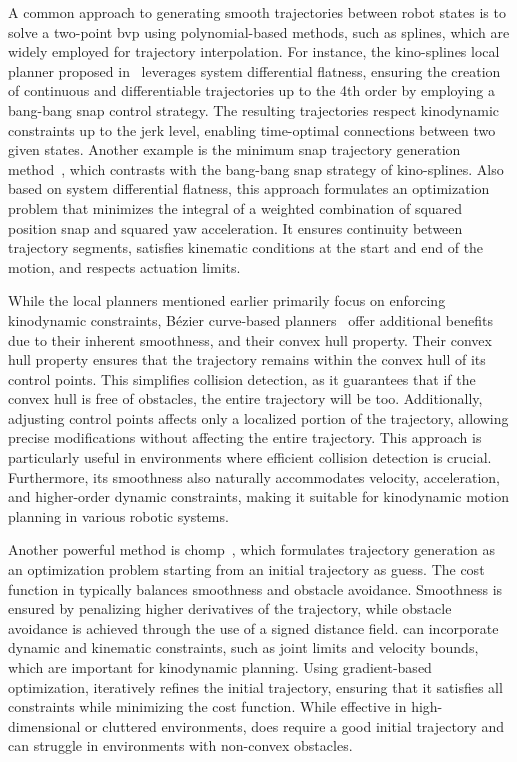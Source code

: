 A common approach to generating smooth trajectories between robot states is to solve a two-point \gls{bvp} using polynomial-based methods, such as splines, which are widely employed for trajectory interpolation. 
For instance, the kino-splines local planner proposed in~\cite{cKino} leverages system differential flatness, ensuring the creation of continuous and differentiable trajectories up to the 4th order by employing a bang-bang snap control strategy. 
The resulting trajectories respect kinodynamic constraints up to the jerk level, enabling time-optimal connections between two given states. 
Another example is the minimum snap trajectory generation method~\cite{cMinimumSnap}, which contrasts with the bang-bang snap strategy of kino-splines. 
Also based on system differential flatness, this approach formulates an optimization problem that minimizes the integral of a weighted combination of squared position snap and squared yaw acceleration.
It ensures continuity between trajectory segments, satisfies kinematic conditions at the start and end of the motion, and respects actuation limits.

While the local planners mentioned earlier primarily focus on enforcing kinodynamic constraints, Bézier curve-based planners~\cite{cBezier,cBezier2} offer additional benefits due to their inherent smoothness, and their convex hull property.
Their convex hull property ensures that the trajectory remains within the convex hull of its control points. 
This simplifies collision detection, as it guarantees that if the convex hull is free of obstacles, the entire trajectory will be too. 
Additionally, adjusting control points affects only a localized portion of the trajectory, allowing precise modifications without affecting the entire trajectory. 
This approach is particularly useful in environments where efficient collision detection is crucial.
Furthermore, its smoothness also naturally accommodates velocity, acceleration, and higher-order dynamic constraints, making it suitable for kinodynamic motion planning in various robotic systems. 

Another powerful method is \gls{chomp}~\cite{cCHOMP}, which formulates trajectory generation as an optimization problem starting from an initial trajectory as guess. 
The cost function in  typically balances smoothness and obstacle avoidance.
Smoothness is ensured by penalizing higher derivatives of the trajectory, while obstacle avoidance is achieved through the use of a signed distance field. 
 can incorporate dynamic and kinematic constraints, such as joint limits and velocity bounds, which are important for kinodynamic planning. 
Using gradient-based optimization,  iteratively refines the initial trajectory, ensuring that it satisfies all constraints while minimizing the cost function. 
While effective in high-dimensional or cluttered environments,  does require a good initial trajectory and can struggle in environments with non-convex obstacles.

